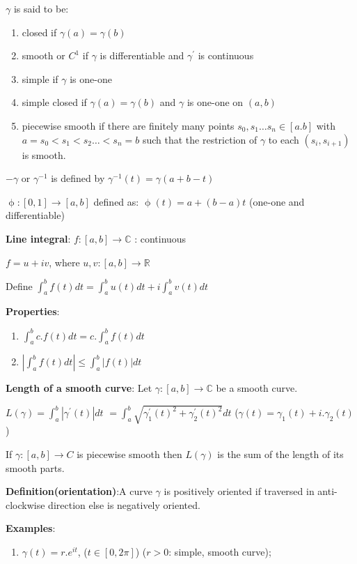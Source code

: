 \documentclass{article}
\begin{document}
\begin{flushleft}
$\gamma$ is said to be:
\begin{enumerate}
    \item closed if $\gamma(a)=\gamma(b)$
    \item smooth or $C^1$ if $\gamma$ is differentiable and $\gamma^{'}$ is continuous
    \item simple if $\gamma$ is one-one
    \item simple closed if $\gamma(a)=\gamma(b)$ and $\gamma$ is one-one on $(a,b)$
    \item piecewise smooth if there are finitely many points $s_0,s_1 \dots s_n\in [a.b]$ with $a=s_0<s_1<s_2 \dots <s_n=b$ such that the restriction of $\gamma$ to each $(s_i,s_{i+1})$ is smooth.

\end{enumerate}

$-\gamma$ or $\gamma^{-1}$ is defined by $\gamma^{-1}(t)=\gamma(a+b-t)$

$\upphi:[0,1]\rightarrow [a,b]$ defined as: $\upphi(t)=a+(b-a)t$ (one-one and differentiable)

\textbf{Line integral}: $f:[a,b]\rightarrow \mathds{C}$ : continuous

$f=u+iv$, where $u,v:[a,b]\rightarrow \mathds{R}$

Define $\int_{a}^{b}f(t) dt= \int_{a}^{b}u(t) dt+ i \int_{a}^{b} v(t) dt$

\textbf{Properties}:

\begin{enumerate}
    \item $\int_{a}^{b} c.f(t) dt= c.\int_{a}^{b}f(t) dt$
    \item $| \int_{a}^{b}f(t) dt |\leq \int_{a}^{b}|f(t)| dt$
\end{enumerate}
\textbf{Length of a smooth curve}: Let $\gamma:[a,b]\rightarrow \mathds{C}$ be a smooth curve. 

$L(\gamma)= \int_{a}^{b} |\gamma^{'}(t)| dt$
$=\int_{a}^{b} \sqrt{\gamma_1^{'}(t)^2+\gamma_2^{'}(t)^2}  dt$  ($\gamma(t)=\gamma_1(t)+i.\gamma_2(t)$)

If $\gamma:[a,b]\rightarrow C$ is piecewise smooth then $L(\gamma)$ is the sum of the length of its smooth parts.

\textbf{Definition(orientation)}:A curve $\gamma$ is positively oriented if traversed in anti-clockwise direction else is negatively oriented.

\textbf{Examples}:
\begin{enumerate}
    \item $\gamma(t)=r.e^{it}$, ($t\in [0,2\pi]$) ($r>0$: simple, smooth curve); 
    

\end{enumerate}
\end{flushleft}
\end{document}

